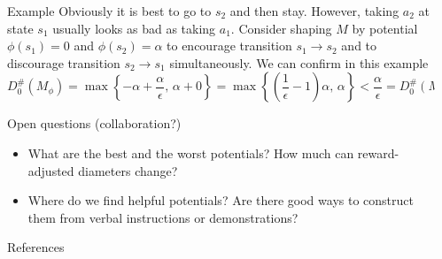 \documentclass[final]{beamer}
\newlength{\sepwidth}
\newlength{\colwidth}
\newcommand{\separatorcolumn}{\begin{column}{\sepwidth}\end{column}}
\begin{document}
\begin{frame}[t]
\begin{columns}[t]
\begin{column}{\colwidth}
\begin{block}{Example}
  Obviously it is best to go to $s_2$ and then stay. However, taking $a_2$ at state $s_1$ usually looks as bad as taking $a_1$. Consider shaping $M$ by potential $\phi(s_1) = 0$ and $\phi(s_2) = \alpha$ to encourage transition $s_1 \rightarrow s_2$ and to discourage transition $s_2 \rightarrow s_1$ simultaneously. We can confirm in this example 
  $$ D_0^\#(M_\phi) = \max \left\{ -\alpha + \frac{\alpha}{\epsilon}, \, \alpha + 0 \right\} = \max \left\{ \left(\frac{1}{\epsilon} - 1\right) \alpha, \, \alpha \right\} < \frac{\alpha}{\epsilon} = D_0^\#(M). $$

  \end{block}

  \begin{block}{Open questions (collaboration?)}
  \begin{itemize}
      \item What are the best and the worst potentials? How much can reward-adjusted diameters change? 
      \item Where do we find helpful potentials? Are there good ways to construct them from verbal instructions or demonstrations?
  \end{itemize}
  \end{block}

  \begin{block}{References}

    \nocite{*}
    \footnotesize{}

  \end{block}

\end{column}

\separatorcolumn
\end{columns}

\end{frame}
\end{document}
